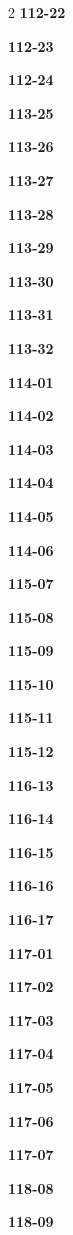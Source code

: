 \documentclass[10pt,a4paper]{article}
\begin{document}
\begin{multicols}{2}
\noindent\textbf{112-22}\ \par
\noindent\textbf{112-23}\ \par
\noindent\textbf{112-24}\ \par
\noindent\textbf{113-25}\ \par
\noindent\textbf{113-26}\ \par
\noindent\textbf{113-27}\ \par
\noindent\textbf{113-28}\ \par
\noindent\textbf{113-29}\ \par
\noindent\textbf{113-30}\ \par
\noindent\textbf{113-31}\ \par
\noindent\textbf{113-32}\ \par
\noindent\textbf{114-01}\ \par
\noindent\textbf{114-02}\ \par
\noindent\textbf{114-03}\ \par
\noindent\textbf{114-04}\ \par
\noindent\textbf{114-05}\ \par
\noindent\textbf{114-06}\ \par
\noindent\textbf{115-07}\ \par
\noindent\textbf{115-08}\ \par
\noindent\textbf{115-09}\ \par
\noindent\textbf{115-10}\ \par
\noindent\textbf{115-11}\ \par
\noindent\textbf{115-12}\ \par
\noindent\textbf{116-13}\ \par
\noindent\textbf{116-14}\ \par
\noindent\textbf{116-15}\ \par
\noindent\textbf{116-16}\ \par
\noindent\textbf{116-17}\ \par
\noindent\textbf{117-01}\ \par
\noindent\textbf{117-02}\ \par
\noindent\textbf{117-03}\ \par
\noindent\textbf{117-04}\ \par
\noindent\textbf{117-05}\ \par
\noindent\textbf{117-06}\ \par
\noindent\textbf{117-07}\ \par
\noindent\textbf{118-08}\ \par
\noindent\textbf{118-09}\ \par

\end{multicols}
\end{document}
